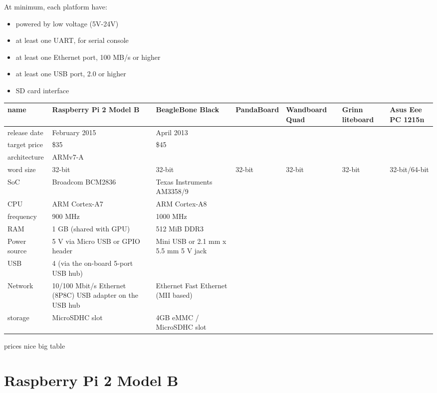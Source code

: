 \documentclass[printmode]{mgr}
\begin{document}
At minimum, each platform have:
\begin{itemize}
  \item powered by low voltage (5V-24V)
  \item at least one UART, for serial console
  \item at least one Ethernet port, 100 MB/s or higher
  \item at least one USB port, 2.0 or higher
  \item SD card interface
\end{itemize}

\renewcommand{\arraystretch}{2}
\begin{center}
  \begin{tabular}{| p{2cm} | p{2cm} | p{2cm} | p{2cm} | p{2cm} | p{2cm} | p{2cm} |}
    \hline
    name & Raspberry Pi 2 Model B & BeagleBone Black & PandaBoard & Wandboard Quad & Grinn liteboard & Asus Eee PC 1215n \\
    \hline
    release date & February 2015 & April 2013 &  &  &  &\\
    \hline
    target price & \$35 & \$45 &  &  &  &\\
    \hline
    architecture & ARMv7-A &  &  &  &  &\\
    \hline
    word size & 32-bit & 32-bit & 32-bit & 32-bit & 32-bit & 32-bit/64-bit \\
    \hline
    SoC & Broadcom BCM2836 & Texas Instruments AM3358/9 &  &  &  &\\
    \hline
    CPU & ARM Cortex-A7 & ARM Cortex-A8 &  &  &  &\\
    \hline
    frequency & 900 MHz & 1000 MHz &  &  &  &\\
    \hline
    RAM & 1 GB (shared with GPU) & 512 MiB DDR3 &  &  &  &\\
    \hline
    Power source & 5 V via Micro USB or GPIO header & Mini USB or 2.1 mm x 5.5 mm 5 V jack &  &  &  &\\
    \hline
    USB & 4 (via the on-board 5-port USB hub) &  &  &  &  &\\
    \hline
    Network & 10/100 Mbit/s Ethernet (8P8C) USB adapter on the USB hub & Ethernet Fast Ethernet (MII based) &  &  &  &\\
    \hline
    storage & MicroSDHC slot & 4GB eMMC / MicroSDHC slot &  &  &  &\\
    \hline
  \end{tabular}
\end{center}
prices
nice big table

\section{Raspberry Pi 2 Model B}
\end{document}

